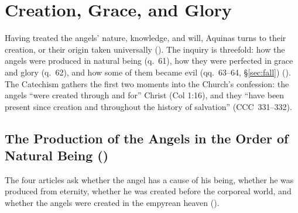 \section{Creation, Grace, and Glory}\label{sec:creation}

Having treated the angels' nature, knowledge, and will, Aquinas turns to
their creation, or their origin taken universally (). The inquiry is
threefold: how the angels were produced in natural being (q.~61), how
they were perfected in grace and glory (q.~62), and how some of them
became evil (qq.~63--64, \S\ref{sec:fall}) (). The
Catechism gathers the first two moments into the Church's confession:
the angels ``were created through and for'' Christ (Col 1:16), and they
``have been present since creation and throughout the history of
salvation'' (CCC~331--332).

\subsection{The Production of the Angels in the Order of Natural Being
()}\label{sec:q61}

The four articles ask whether the angel has a cause of his being,
whether he was produced from eternity, whether he was created before the
corporeal world, and whether the angels were created in the empyrean
heaven ().

